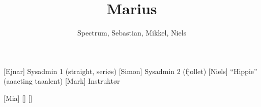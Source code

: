 \documentclass[a4paper,11pt]{article}
\title{Marius}
\author{Spectrum, Sebastian, Mikkel, Niels}
\begin{document}
\maketitle

\begin{roles}
[Ejnar] Sysadmin 1 (straight, seriøs)
[Simon] Sysadmin 2 (fjollet)
[Niels] ``Hippie'' (aaacting taaalent)
[Mark] Instruktør
\end{roles}

\begin{props}
[Mia]
[]
[]
\end{props}


\begin{sketch}




\end{sketch}
\end{document}

